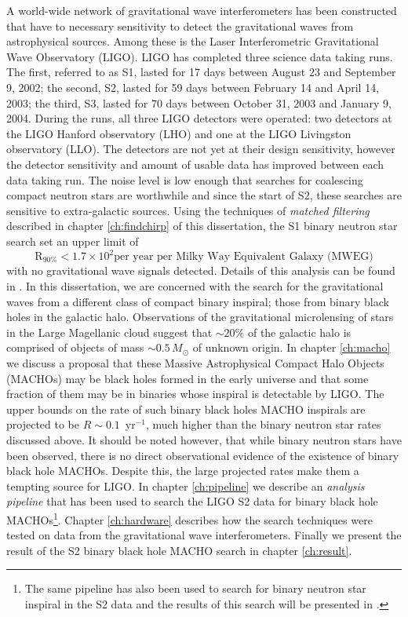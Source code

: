 A world-wide network of gravitational wave interferometers has been
constructed that have to necessary sensitivity to detect the gravitational
waves from astrophysical sources. Among these is the Laser Interferometric
Gravitational Wave Observatory (LIGO)\cite{Barish:1999}. LIGO has completed
three science data taking runs. The first, referred to as S1, lasted for 17
days between August 23 and September 9, 2002; the second, S2, lasted for 59
days between February 14 and April 14, 2003; the third, S3, lasted for 70 days
between October 31, 2003 and January 9, 2004.  During the runs, all three LIGO
detectors were operated: two detectors at the LIGO Hanford observatory (LHO)
and one at the LIGO Livingston observatory (LLO).  The detectors are not yet
at their design sensitivity, however the detector sensitivity and amount of
usable data has improved between each data taking run. The noise level is low
enough that searches for coalescing compact neutron stars are worthwhile and
since the start of S2, these searches are sensitive to extra-galactic sources.
Using the techniques of \emph{matched filtering} described in chapter
\ref{ch:findchirp} of this dissertation, the S1 binary neutron star search set
an upper limit of
\begin{equation}
\mathrm{R}_{90\%} < 1.7 \times 10^2 \textrm{per year per Milky Way Equivalent Galaxy (MWEG)}
\end{equation}
with no gravitational wave signals detected. Details of this analysis can be
found in \cite{LIGOS1iul}. In this dissertation, we are concerned with the
search for the gravitational waves from a different class of compact binary
inspiral; those from binary black holes in the galactic halo. Observations of
the gravitational microlensing of stars in the Large Magellanic cloud suggest
that $\sim 20\%$ of the galactic halo is comprised of objects of mass $\sim
0.5\,M_\odot$ of unknown origin. In chapter \ref{ch:macho} we discuss a
proposal that these Massive Astrophysical Compact Halo Objects (MACHOs) may be
black holes formed in the early universe and that some fraction of them may be
in binaries whose inspiral is detectable by LIGO\cite{Nakamura:1997sm}.  The
upper bounds on the rate of such binary black holes MACHO inspirals are
projected to be $R \sim 0.1$~yr$^{-1}$, much higher than the binary neutron
star rates discussed above. It should be noted however, that while binary
neutron stars have been observed, there is no direct observational evidence of
the existence of binary black hole MACHOs. Despite this, the large projected
rates make them a tempting source for LIGO. In chapter \ref{ch:pipeline} we
describe an \emph{analysis pipeline} that has been used to search the LIGO S2
data for binary black hole MACHOs\footnote{The same pipeline has also been
used to search for binary neutron star inspiral in the S2 data and the results
of this search will be presented in \cite{LIGOS2iul}.}. Chapter
\ref{ch:hardware} describes how the search techniques were tested on data from
the gravitational wave interferometers. Finally we present the result of the
S2 binary black hole MACHO search in chapter \ref{ch:result}. 

